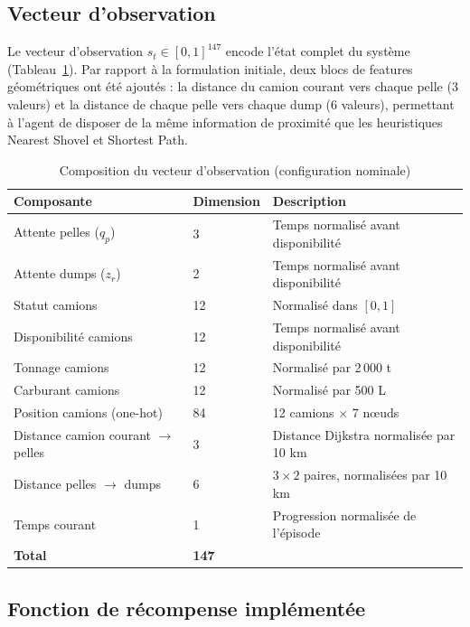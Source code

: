 \documentclass[11pt,a4paper]{report}
\begin{document}
\subsection{Vecteur d'observation}

Le vecteur d'observation $s_t \in [0, 1]^{147}$ encode l'état complet du système (Tableau~\ref{tab:observation-dim}). Par rapport à la formulation initiale, deux blocs de features géométriques ont été ajoutés : la distance du camion courant vers chaque pelle (3 valeurs) et la distance de chaque pelle vers chaque dump (6 valeurs), permettant à l'agent de disposer de la même information de proximité que les heuristiques Nearest Shovel et Shortest Path.

\begin{table}[H]
\centering
\caption{Composition du vecteur d'observation (configuration nominale)}
\label{tab:observation-dim}
\begin{tabular}{lll}
\toprule
\textbf{Composante} & \textbf{Dimension} & \textbf{Description} \\
\midrule
Attente pelles ($q_p$) & 3 & Temps normalisé avant disponibilité \\
Attente dumps ($z_r$) & 2 & Temps normalisé avant disponibilité \\
Statut camions & 12 & Normalisé dans $[0, 1]$ \\
Disponibilité camions & 12 & Temps normalisé avant disponibilité \\
Tonnage camions & 12 & Normalisé par 2\,000 t \\
Carburant camions & 12 & Normalisé par 500 L \\
Position camions (one-hot) & 84 & 12 camions $\times$ 7 nœuds \\
Distance camion courant $\to$ pelles & 3 & Distance Dijkstra normalisée par 10 km \\
Distance pelles $\to$ dumps & 6 & $3 \times 2$ paires, normalisées par 10 km \\
Temps courant & 1 & Progression normalisée de l'épisode \\
\midrule
\textbf{Total} & \textbf{147} & \\
\bottomrule
\end{tabular}
\end{table}

\subsection{Fonction de récompense implémentée}
\end{document}
